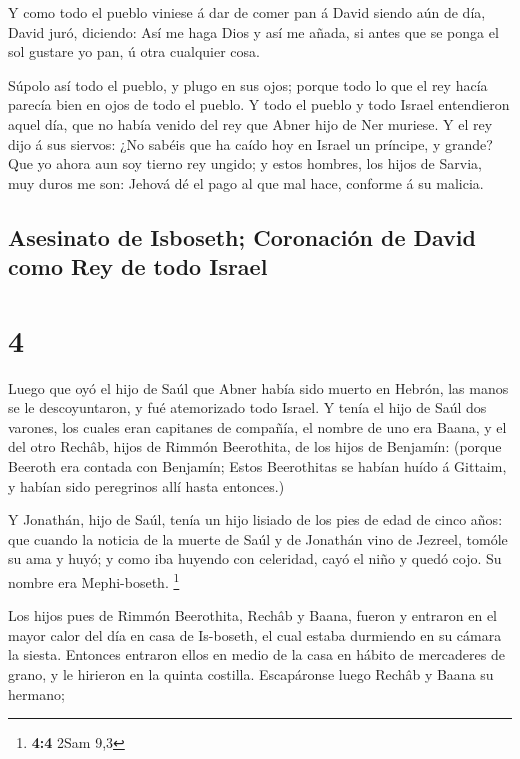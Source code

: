  Y como todo el pueblo viniese á dar de comer pan á David
siendo aún de día, David juró, diciendo: Así me haga Dios y así me
añada, si antes que se ponga el sol gustare yo pan, ú otra cualquier
cosa.

 Súpolo así todo el pueblo, y plugo en sus ojos; porque
todo lo que el rey hacía parecía bien en ojos de todo el pueblo.
 Y todo el pueblo y todo Israel entendieron aquel día, que
no había venido del rey que Abner hijo de Ner muriese.  Y
el rey dijo á sus siervos: ¿No sabéis que ha caído hoy en Israel un
príncipe, y grande?  Que yo ahora aun soy tierno rey
ungido; y estos hombres, los hijos de Sarvia, muy duros me son: Jehová
dé el pago al que mal hace, conforme á su malicia.

\hypertarget{asesinato-de-isboseth-coronaciuxf3n-de-david-como-rey-de-todo-israel}{%
\subsection{Asesinato de Isboseth; Coronación de David como Rey de todo
Israel}\label{asesinato-de-isboseth-coronaciuxf3n-de-david-como-rey-de-todo-israel}}

\hypertarget{section-3}{%
\section{4}\label{section-3}}

 Luego que oyó el hijo de Saúl que Abner había sido muerto
en Hebrón, las manos se le descoyuntaron, y fué atemorizado todo Israel.
 Y tenía el hijo de Saúl dos varones, los cuales eran
capitanes de compañía, el nombre de uno era Baana, y el del otro Rechâb,
hijos de Rimmón Beerothita, de los hijos de Benjamín: (porque Beeroth
era contada con Benjamín;  Estos Beerothitas se habían huído
á Gittaim, y habían sido peregrinos allí hasta entonces.)

 Y Jonathán, hijo de Saúl, tenía un hijo lisiado de los pies
de edad de cinco años: que cuando la noticia de la muerte de Saúl y de
Jonathán vino de Jezreel, tomóle su ama y huyó; y como iba huyendo con
celeridad, cayó el niño y quedó cojo. Su nombre era Mephi-boseth.
\footnote{\textbf{4:4} 2Sam 9,3}

 Los hijos pues de Rimmón Beerothita, Rechâb y Baana, fueron
y entraron en el mayor calor del día en casa de Is-boseth, el cual
estaba durmiendo en su cámara la siesta.  Entonces entraron
ellos en medio de la casa en hábito de mercaderes de grano, y le
hirieron en la quinta costilla. Escapáronse luego Rechâb y Baana su
hermano;

